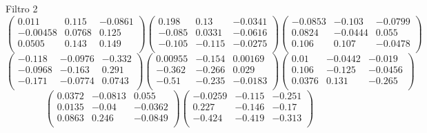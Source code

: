 Filtro 2
{ \small
\[
\begin{pmatrix}
  0.011 & 0.115 & -0.0861 \\
  -0.00458 & 0.0768 & 0.125 \\
  0.0505 & 0.143 & 0.149 \\
\end{pmatrix}
\begin{pmatrix}
  0.198 & 0.13 & -0.0341 \\
  -0.085 & 0.0331 & -0.0616 \\
  -0.105 & -0.115 & -0.0275 \\
\end{pmatrix}
\begin{pmatrix}
  -0.0853 & -0.103 & -0.0799 \\
  0.0824 & -0.0444 & 0.055 \\
  0.106 & 0.107 & -0.0478 \\
\end{pmatrix}
\]
\[
\begin{pmatrix}
  -0.118 & -0.0976 & -0.332 \\
  -0.0968 & -0.163 & 0.291 \\
  -0.171 & -0.0774 & 0.0743 \\
\end{pmatrix}
\begin{pmatrix}
  0.00955 & -0.154 & 0.00169 \\
  -0.362 & -0.266 & 0.029 \\
  -0.51 & -0.235 & -0.0183 \\
\end{pmatrix}
\begin{pmatrix}
  0.01 & -0.0442 & -0.019 \\
  0.106 & -0.125 & -0.0456 \\
  0.0376 & 0.131 & -0.265 \\
\end{pmatrix}
\]
\[
\begin{pmatrix}
  0.0372 & -0.0813 & 0.055 \\
  0.0135 & -0.04 & -0.0362 \\
  0.0863 & 0.246 & -0.0849 \\
\end{pmatrix}
\begin{pmatrix}
  -0.0259 & -0.115 & -0.251 \\
  0.227 & -0.146 & -0.17 \\
  -0.424 & -0.419 & -0.313 \\
\end{pmatrix}
\]
}

